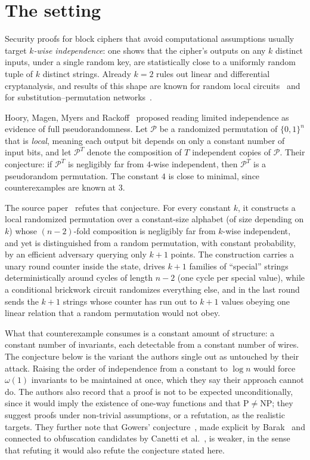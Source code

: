 \documentclass{conjura-conjecture}
\newcommand{\bits}{\{0,1\}}
\newcommand{\cP}{\mathcal{P}}
\begin{document}
\section{The setting}\label{sec:setting}

Security proofs for block ciphers that avoid computational assumptions
usually target \emph{$k$-wise independence}: one shows that the cipher's
outputs on any $k$ distinct inputs, under a single random key, are
statistically close to a uniformly random tuple of $k$ distinct strings.
Already $k = 2$ rules out linear and differential cryptanalysis, and
results of this shape are known for random local
circuits~\cite{Gow96,BH08,GHP25,GHKO25} and for
substitution--permutation networks~\cite{LTV21}.

Hoory, Magen, Myers and Rackoff~\cite{HMMR04,HMMR05} proposed reading
limited independence as evidence of full pseudorandomness. Let $\cP$ be
a randomized permutation of $\bits^n$ that is \emph{local}, meaning each
output bit depends on only a constant number of input bits, and let
$\cP^{T}$ denote the composition of $T$ independent copies of $\cP$.
Their conjecture: if $\cP^{T}$ is negligibly far from $4$-wise
independent, then $\cP^{T}$ is a pseudorandom permutation. The constant
$4$ is close to minimal, since counterexamples are known at $3$.

The source paper~\cite{DPT26} refutes that conjecture. For every
constant $k$, it constructs a local randomized permutation over a
constant-size alphabet (of size depending on $k$) whose $(n-2)$-fold
composition is negligibly far from $k$-wise independent, and yet is
distinguished from a random permutation, with constant probability, by
an efficient adversary querying only $k+1$ points. The construction
carries a unary round counter inside the state, drives $k+1$ families of
``special'' strings deterministically around cycles of length $n-2$ (one
cycle per special value), while a conditional brickwork circuit
randomizes everything else, and in the last round sends the $k+1$
strings whose counter has run out to $k+1$ values obeying one linear
relation that a random permutation would not obey.

What that counterexample consumes is a constant amount of structure: a
constant number of invariants, each detectable from a constant number of
wires. The conjecture below is the variant the authors single out as
untouched by their attack. Raising the order of independence from a
constant to $\log n$ would force $\omega(1)$ invariants to be maintained
at once, which they say their approach cannot do. The authors also
record that a proof is not to be expected unconditionally, since it
would imply the existence of one-way functions and that
$\mathrm{P} \neq \mathrm{NP}$; they suggest proofs under non-trivial
assumptions, or a refutation, as the realistic targets. They further
note that Gowers' conjecture~\cite{Gow96}, made explicit by
Barak~\cite{Bar17} and connected to obfuscation candidates by Canetti et
al.~\cite{CCMR24}, is weaker, in the sense that refuting it would also
refute the conjecture stated here.
\end{document}
